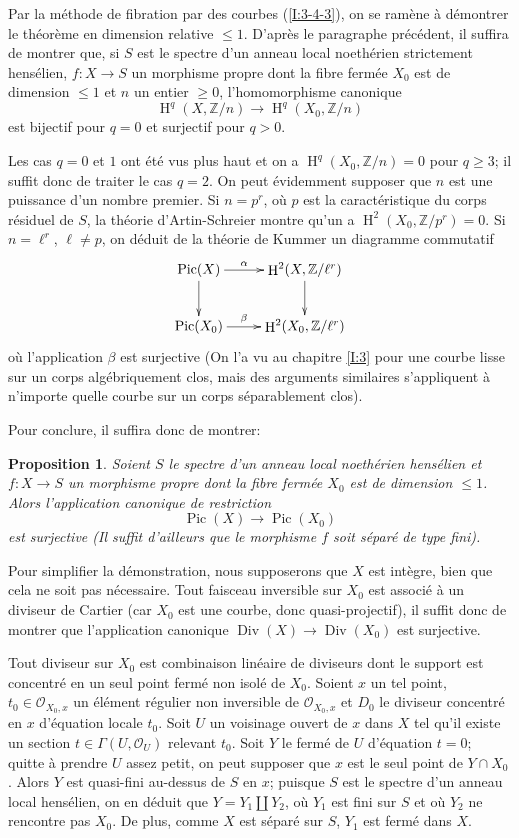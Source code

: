 \documentclass{book}
\DeclareMathOperator{\Div}{Div}
\DeclareMathOperator{\h}{H}
\DeclareMathOperator{\pic}{Pic}
\newcommand{\cO}{\mathcal{O}}
\newcommand{\dZ}{\mathbb{Z}}
\newtheorem{proposition}[subsubsection]{Proposition}
\begin{document}
Par la méthode de fibration par des courbes (\ref{I:3-4-3}), on se ramène 
à démontrer le théorème en dimension relative $\leqslant 1$. D'après 
le paragraphe précédent, il suffira de montrer que, si $S$ est le spectre 
d'un anneau local noethérien strictement hensélien, $f:X\to S$ un 
morphisme propre dont la fibre fermée $X_0$ est de dimension $\leqslant 1$ 
et $n$ un entier $\geqslant 0$, l'homomorphisme canonique 
\[
  \h^q(X,\dZ/n) \to \h^q(X_0,\dZ/n)
\]
est bijectif pour $q=0$ et surjectif pour $q>0$. 

Les cas $q=0$ et $1$ ont été vus plus haut et on a $\h^q(X_0,\dZ/n) = 0$ 
pour $q\geqslant 3$; il suffit donc de traiter le cas $q=2$. On peut 
évidemment supposer que $n$ est une puissance d'un nombre premier. Si 
$n=p^r$, où $p$ est la caractéristique du corps résiduel de $S$, la 
théorie d'Artin-Schreier montre qu'un a $\h^2(X_0,\dZ/p^r) = 0$. Si 
$n=\ell^r$, $\ell\ne p$, on déduit de la théorie de Kummer un diagramme 
commutatif 
\[\xymatrix{
  \pic(X) \ar[d] \ar[r]^-\alpha 
    & \h^2(X,\dZ/\ell^r) \ar[d] \\
  \pic(X_0) \ar[r]^-\beta 
    & \h^2(X_0,\dZ/\ell^r)
}\]
où l'application $\beta$ est surjective (On l'a vu au chapitre \ref{I:3} pour 
une courbe lisse sur un corps algébriquement clos, mais des arguments 
similaires s'appliquent à n'importe quelle courbe sur un corps 
séparablement clos). 

Pour conclure, il suffira donc de montrer:





\begin{proposition}\label{I:4-4-1}
Soient $S$ le spectre d'un anneau local noethérien hensélien et $f:X\to S$ 
un morphisme propre dont la fibre fermée $X_0$ est de dimension 
$\leqslant 1$. Alors l'application canonique de restriction 
\[
  \pic(X)\to \pic(X_0)
\]
est surjective (Il suffit d'ailleurs que le morphisme $f$ soit 
\emph{séparé} de type fini). 
\end{proposition}

Pour simplifier la démonstration, nous supposerons que $X$ est intègre, 
bien que cela ne soit pas nécessaire. Tout faisceau inversible sur $X_0$ est 
associé à un diviseur de Cartier (car $X_0$ est une courbe, donc 
quasi-projectif), il suffit donc de montrer que l'application canonique 
$\Div(X)\to\Div(X_0)$ est surjective. 

Tout diviseur sur $X_0$ est combinaison linéaire de diviseurs dont le 
support est concentré en un seul point fermé non isolé de $X_0$. Soient 
$x$ un tel point, $t_0\in\cO_{X_0,x}$ un élément régulier non inversible 
de $\cO_{X_0,x}$ et $D_0$ le diviseur concentré en $x$ d'équation locale 
$t_0$. Soit $U$ un voisinage ouvert de $x$ dans $X$ tel qu'il existe un section 
$t\in \Gamma(U,\cO_U)$ relevant $t_0$. Soit $Y$ le fermé de $U$ d'équation 
$t=0$; quitte à prendre $U$ assez petit, on peut supposer que $x$ est le 
seul point de $Y\cap X_0$. Alors $Y$ est quasi-fini au-dessus de $S$ en $x$; 
puisque $S$ est le spectre d'un anneau local hensélien, on en déduit que 
$Y=Y_1\amalg Y_2$, où $Y_1$ est fini sur $S$ et où $Y_2$ ne rencontre pas 
$X_0$. De plus, comme $X$ est séparé sur $S$, $Y_1$ est fermé dans $X$. 
\end{document}
